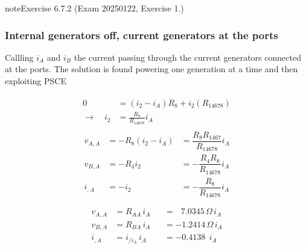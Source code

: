 \documentclass[letterpaper,10pt,english]{jupyterBook}
\begin{document}
\begin{sphinxadmonition}{note}{Exercise 6.7.2 (Exam 2025\sphinxhyphen{}01\sphinxhyphen{}22, Exercise 1.)}
\subsubsection*{Internal generators off, current generators at the ports}

\sphinxAtStartPar
Callling \(i_A\) and \(i_B\) the current passing through the current generators connected at the ports. The solution is found powering one generation at a time and then exploiting PSCE

\sphinxAtStartPar
{}
\begin{equation*}
\begin{split}\begin{aligned}
  0 & = (i_2 - i_A) R_8 + i_2 (R_{14678}) \\
\rightarrow \quad 
 i_2 & = \frac{R_8}{R_{14678}} i_A
\end{aligned}\end{split}
\end{equation*}\begin{equation*}
\begin{split}\begin{aligned}
  v_{A,A} & =  -R_8 ( i_2 - i_A ) & = \dfrac{R_8 R_{1467}}{R_{14678}} i_A \\
  v_{B,A} & = - R_4 i_2 & = - \dfrac{R_4 R_8}{R_{14678}} i_A \\
    i_{,A}& = - i_2 & = - \dfrac{R_8}{R_{14678}} i_A \\
\end{aligned}\end{split}
\end{equation*}\begin{equation*}
\begin{split}\begin{aligned}
 v_{A,A} & = R_{AA}   \, i_A && = \ \ \ 7.0345  \, \Omega \, i_A \\ 
 v_{B,A} & = R_{BA}   \, i_A && = - 1.2414  \, \Omega \, i_A \\
   i_{,A} & = i_{/i_A}\, i_A && = - 0.4138 \ \  i_A \\
\end{aligned}\end{split}
\end{equation*}
\sphinxAtStartPar
{}




\end{sphinxadmonition}
\end{document}
